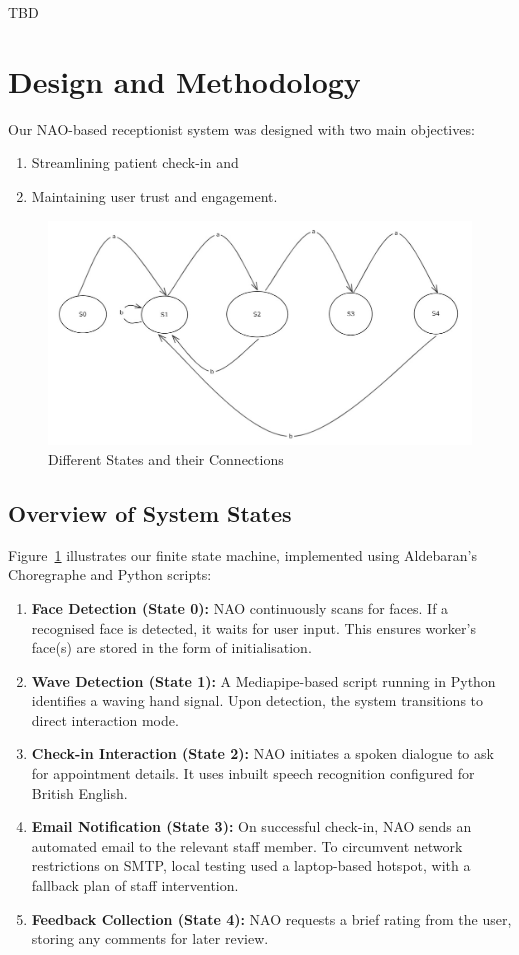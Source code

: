 \documentclass[conference]{IEEEtran}
\begin{document}
TBD

\section{Design and Methodology}

Our NAO-based receptionist system was designed with two main objectives:
\begin{enumerate}
        \item Streamlining patient check-in and
        \item Maintaining user trust and engagement.
\end{enumerate}

\begin{figure}
        \centering
        \includegraphics[width=.6\linewidth]{states.jpg}
        \caption{Different States and their Connections}
        \label{Different states}
\end{figure}

\subsection{Overview of System States} Figure~\ref{Different states} illustrates our finite state machine, implemented
using Aldebaran’s Choregraphe and Python scripts:

\begin{enumerate} \item \textbf{Face Detection (State 0):} NAO continuously scans for faces. If a recognised face is detected, it waits for user input. This ensures worker's face(s) are stored in the form of initialisation.
        \item \textbf{Wave Detection (State 1):} A Mediapipe-based script running in Python identifies a waving hand signal. Upon detection, the system transitions to direct interaction mode.
        \item \textbf{Check-in Interaction (State 2):} NAO initiates a spoken dialogue to ask for appointment details. It uses inbuilt speech recognition configured for British English.
        \item \textbf{Email Notification (State 3):} On successful check-in, NAO sends an automated email to the relevant staff member. To circumvent network restrictions on SMTP, local testing used a laptop-based hotspot, with a fallback plan of staff intervention.
        \item \textbf{Feedback Collection (State 4):} NAO requests a brief rating from the user, storing any comments for later review.
\end{enumerate}
\end{document}

